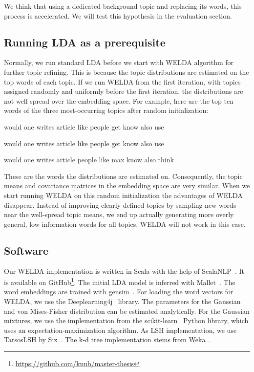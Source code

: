 \documentclass[
        a4paper,
        titlepage,
        twoside,
        parskip,
        numbers=noenddot
        ]{scrbook}
\newcommand{\topicbox}[1]{
  \setlength{\OuterFrameSep}{0pt}
  \begin{framed}
    #1
  \end{framed}
}
\theoremstyle{break}
\begin{document}
We think that using a dedicated background topic and replacing its words, this process is accelerated.
We will test this hypothesis in the evaluation section.

\subsection{Running LDA as a prerequisite}
Normally, we run standard LDA before we start with WELDA algorithm for further topic refining.
This is because the topic distributions are estimated on the top words of each topic.
If we run WELDA from the first iteration, with topics assigned randomly and uniformly before the first iteration, the distributions are not well spread over the embedding space.
For example, here are the top ten words of the three most-occurring topics after random initialization:
\topicbox{
  would one writes article like people get know also use \par
  would one writes article like people get know also use \par
  would one writes article people like max know also think
}

These are the words the distributions are estimated on.
Consequently, the topic means and covariance matrices in the embedding space are very similar.
When we start running WELDA on this random initialization the advantages of WELDA disappear.
Instead of improving clearly defined topics by sampling new words near the well-spread topic means, we end up actually generating more overly general, low information words for all topics.
WELDA will not work in this case.

\subsection{Software}

Our WELDA implementation is written in Scala with the help of ScalaNLP~\cite{ScalaNlp2009}.
It is available on GitHub\footnote{\url{https://github.com/knub/master-thesis}}.
The initial LDA model is inferred  with Mallet~\cite{McCallum2002}.
The word embeddings are trained with gensim~\cite{Rehurek2010}.
For loading the word vectors for WELDA, we use the Deeplearning4j~\cite{DL4J2016} library.
The parameters for the Gaussian and von Mises-Fisher distribution can be estimated analytically.
For the Gaussian mixtures, we use the implementation from the scikit-learn~\cite{Pedregosa2012} Python library, which uses an expectation-maximization algorithm.
As LSH implementation, we use TarsosLSH by Six~\cite{Six2016}.
The k-d tree implementation stems from Weka~\cite{Hall2009}.
\end{document}
